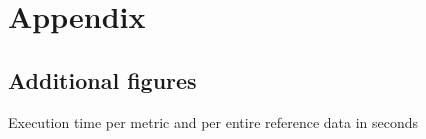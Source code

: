 \documentclass{thesisclass}
\begin{document}


\cleardoublepage

\appendix

\chapter{Appendix}
\label{ch:appendix}

\section{Additional figures}

\begin{centeredFigure}[!ht]
	\caption{Execution time per metric and per entire reference data in seconds}
	\label{fig:times}
\end{centeredFigure}
\end{document}
